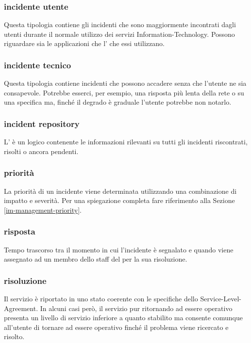 \subsubsection{incidente utente}
Questa tipologia contiene gli incidenti che sono maggiormente incontrati dagli utenti durante il normale utilizzo dei servizi \acs{Information-Technology}. Possono riguardare sia le applicazioni che l' che essi utilizzano.

\subsubsection{incidente tecnico}
Questa tipologia contiene incidenti che possono accadere senza che l'utente ne sia consapevole. Potrebbe esserci, per esempio, una risposta più lenta della rete o su una specifica  ma, finché il degrado è graduale l'utente potrebbe non notarlo.

\subsubsection{incident repository}
L' è un  logico contenente le informazioni rilevanti su tutti gli incidenti riscontrati, risolti o ancora pendenti.

\subsubsection{priorità}
La priorità di un incidente viene determinata utilizzando una combinazione di impatto e severità. Per una spiegazione completa fare riferimento alla Sezione \ref{im-management-priority}.

\subsubsection{risposta}
Tempo trascorso tra il momento in cui l'incidente è segnalato e quando viene assegnato ad un membro dello staff del  per la sua risoluzione.

\subsubsection{risoluzione}
Il servizio è riportato in uno stato coerente con le specifiche dello \ac{Service-Level-Agreement}. In alcuni casi però, il servizio pur ritornando ad essere operativo presenta un livello di servizio inferiore a quanto stabilito ma consente comunque all'utente di tornare ad essere operativo finché il problema viene ricercato e risolto.

